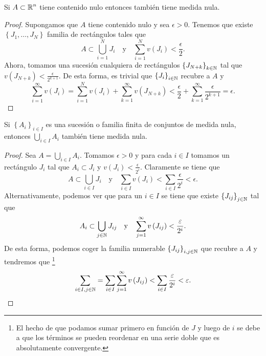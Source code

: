 \begin{prop}
Si $\displaystyle A \subset \mathbb{R}^{n} $ tiene contenido nulo entonces también tiene medida nula.
\end{prop}
\begin{proof}
	Supongamos que $\displaystyle A $ tiene contenido nulo y sea $\displaystyle \epsilon > 0 $. Tenemos que existe $\displaystyle \left\{ J_{1}, \ldots, J_{N}\right\}  $ familia de rectángulos tales que 
	\[A \subset \bigcup_{i = 1}^{N}J_{i} \quad \text{y} \quad \sum^{N}_{i = 1}v\left(J_{i}\right) < \frac{\epsilon }{2}  .\]
	Ahora, tomamos una sucesión cualquiera de rectángulos $\displaystyle \left\{ J_{N+k}\right\} _{k \in \mathbb{N}} $ tal que $\displaystyle v\left(J_{N + k}\right) < \frac{\epsilon }{2^{k+1}} $. De esta forma, es trivial que $\displaystyle \left\{ J_{i}\right\} _{i \in \mathbb{N}} $ recubre a $\displaystyle A $ y
	\[\sum^{\infty}_{i = 1}v\left(J_{i}\right) = \sum^{N}_{i = 1}v\left(J_{i}\right) + \sum^{\infty}_{k = 1}v\left(J_{N + k}\right) < \frac{\epsilon }{2} + \sum^{\infty}_{k = 1}\frac{\epsilon }{2^{k+1}} = \epsilon  .\]
\end{proof}
\begin{prop}
	Si $\displaystyle \left\{ A_{i}\right\} _{i \in I} $ es una sucesión o familia finita de conjuntos de medida nula, entonces $\displaystyle \bigcup_{i \in I} A_{i}$ también tiene medida nula.
\end{prop}
\begin{proof}
Sea $\displaystyle A = \bigcup_{i \in I}A_{i} $. Tomamos $\displaystyle \epsilon > 0 $ y para cada $\displaystyle i \in I $ tomamos un rectángulo $\displaystyle J_{i} $ tal que $\displaystyle A_{i} \subset J_{i} $ y $\displaystyle v\left(J_{i}\right)< \frac{\epsilon }{2^{i}} $. Claramente se tiene que
\[A \subset \bigcup_{i \in I}J_{i} \quad \text{y} \quad \sum_{i \in I}v\left(J_{i}\right) < \sum_{i \in I}\frac{\epsilon }{2^{i}} < \epsilon  .\]
Alternativamente, podemos ver que para un $\displaystyle i \in I $ se tiene que existe $\displaystyle \left\{ J_{ij}\right\} _{j \in \mathbb{N}} $ tal que 
\[A_{i} \subset \bigcup_{j \in \mathbb{N}}J_{ij} \quad \text{y} \quad \sum^{\infty}_{j = 1}v\left(J_{ij}\right) < \frac{\varepsilon }{2^{i}} .\]
De esta forma, podemos coger la familia numerable $\displaystyle \left\{ J_{ij}\right\} _{i,j \in \mathbb{N}} $ que recubre a $\displaystyle A $ y tendremos que \footnote{El hecho de que podamos sumar primero en función de $\displaystyle J $ y luego de $\displaystyle i $ se debe a que los términos se pueden reordenar en una serie doble que es absolutamente convergente.} 
\[ \sum_{i \in I, j \in \mathbb{N}} = \sum_{i \in I}\sum^{\infty}_{j = 1}v\left(J_{ij}\right) < \sum_{i \in I}\frac{\varepsilon }{2^{i}} < \varepsilon .\]
\end{proof}
